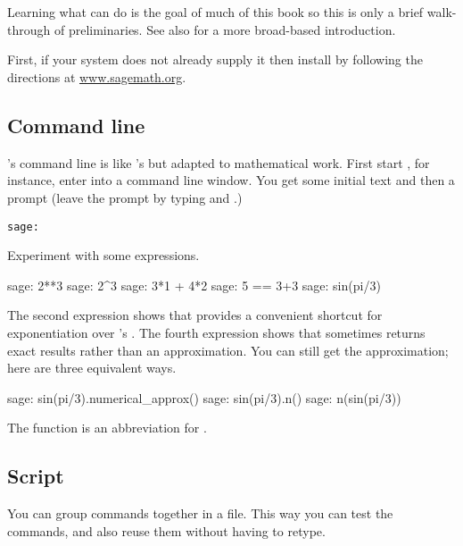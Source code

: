 \section{\Sage}
Learning what \Sage{} can do is the goal of much of this book 
so this is only a brief walk-through of preliminaries.
See also \citep{SageTeam12} for a more broad-based introduction.

First, if your system does not already supply it then install \Sage{} 
by following the directions at
\href{http://www.sagemath.org}{www.sagemath.org}.



\subsection{Command line}
\Sage's command line is like \python's but adapted to 
mathematical work.
First start \Sage,
for instance, enter  into a command line window.
You get some initial text and then a prompt
(leave the prompt by typing 
and .)
\begin{lstlisting}[style=python]
sage:  
\end{lstlisting}

Experiment with some expressions.
\begin{sagecommandline}
sage: 2**3                                                                      
sage: 2^3
sage: 3*1 + 4*2
sage: 5 == 3+3
sage: sin(pi/3)
\end{sagecommandline}
The second expression 
shows that \Sage{} provides a convenient shortcut for exponentiation over
\python's .
The fourth expression
shows that \Sage{} sometimes returns exact results rather than an
approximation.
You can still get the approximation; here are three equivalent ways.
\begin{sagecommandline}
sage: sin(pi/3).numerical_approx()
sage: sin(pi/3).n()
sage: n(sin(pi/3))  
\end{sagecommandline}
\noindent
The function  is an abbreviation for 
.


\subsection{Script}
You can group \Sage{} commands together in a file.
This way you can test the commands, 
and also reuse them without having to retype.

